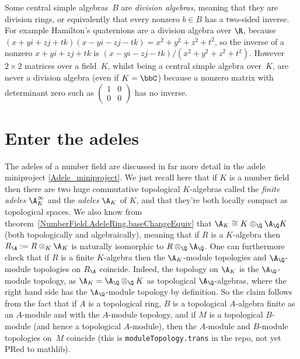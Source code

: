 Some central simple algebras~$B$ are \emph{division algebras}, meaning that they are division
rings, or equivalently that every nonzero $b\in B$ has a two-sided inverse. For example
Hamilton's quaternions are a division algebra over $\R$,
because $(x+yi+zj+tk)(x-yi-zj-tk)=x^2+y^2+z^2+t^2$, so the inverse
of a nonzero $x+yi+zj+tk$ is $(x-yi-zj-tk)/(x^2+y^2+z^2+t^2)$.
However $2\times 2$ matrices over a field~$K$, whilst being a central simple algebra
over~$K$, are never a division algebra
(even if $K=\bbC$) because a nonzero matrix with determinant zero such as
$\begin{pmatrix}1&0\\0&0\end{pmatrix}$ has no inverse.

\section{Enter the adeles}

The adeles of a number field are discussed in far more detail
in the adele miniproject \ref{Adele_miniproject}. We just recall here that if $K$ is a number field
then there are two huge commutative topological $K$-algebras called the \emph{finite adeles}
$\A_K^\infty$ and the \emph{adeles} $\A_K$ of $K$, and that they're both locally compact
as topological spaces. We also know from theorem~\ref{NumberField.AdeleRing.baseChangeEquiv}
that $\A_K\cong K\otimes_{\Q}\A_{\Q}K$ (both topologically and algebraically), meaning
that if $R$ is a $K$-algebra then $R_{\A} := R\otimes_K\A_K$ is naturally isomorphic
to $R\otimes_{\Q}\A_{\Q}$. One can
furthermore check that if $R$ is a finite $K$-algebra then the $\A_K$-module topologies and $\A_{\Q}$-module
topologies on $R_{\A}$ coincide. Indeed, the topology on $\A_K$
is the $\A_{\Q}$-module topology, as
$\A_K=\A_{\Q}\otimes_{\Q}K$ as topological $\A_{\Q}$-algebras, where the right hand side
has the $\A_{\Q}$-module topology by definition. So the claim follows from the
fact that if $A$ is a topological ring, $B$ is a topological $A$-algebra
finite as an $A$-module and with the $A$-module topology, and if
$M$ is a topological $B$-module
(and hence a topological $A$-module), then the $A$-module and $B$-module
topologies on~$M$ coincide (this is {\tt moduleTopology.trans} in the repo,
not yet PRed to mathlib).

